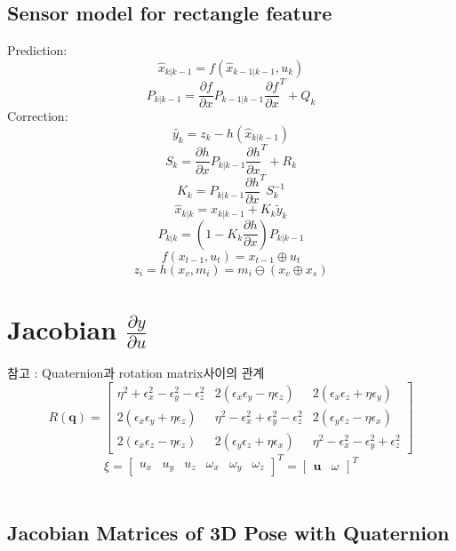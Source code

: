 \documentclass[master,korean,final]{cbnu-ecs}
\begin{document}
\subsection{Sensor model for rectangle feature}
Prediction:
\[
\hat{x}_{k|k-1}=f(\hat{x}_{k-1|k-1}, u_k)
\]
\[
P_{k|k-1}=\frac{\partial{f}}{\partial{x}}P_{k-1|k-1}\frac{\partial{f}}{\partial{x}}^T + Q_k
\]
Correction:
\[
\tilde{y_k}=z_k-h(\hat{x}_{k|k-1})
\]
\[
S_k=\frac{\partial{h}}{\partial{x}}P_{k|k-1}\frac{\partial{h}}{\partial{x}}^T + R_k
\]
\[
K_k=P_{k|k-1}\frac{\partial{h}}{\partial{x}}^T S_k^{-1}
\]
\[
\hat{x}_{k|k}=\hat{x}_{k|k-1}+K_k\tilde{y}_k
\]
\[
P_{k|k}=(1-K_k\frac{\partial{h}}{\partial{x}})P_{k|k-1}
\]
\[
f(x_{t-1}, u_t)= x_{t-1} \oplus u_t
\]
\[
z_i=h(x_v, m_i)=m_i\ominus(x_v\oplus x_s)
\]
\section{Jacobian $\frac{\partial y}{\partial u} $}
참고 : Quaternion과 rotation matrix사이의 관계
\[R(\textbf{q})=
\begin{bmatrix}
\eta^2+\epsilon_x^2-\epsilon_y^2-\epsilon_z^2 & 2(\epsilon_x \epsilon_y - \eta \epsilon_z) & 2(\epsilon_x \epsilon_z + \eta \epsilon_y) \\
2(\epsilon_x \epsilon_y + \eta \epsilon_z) & \eta^2-\epsilon_x^2+\epsilon_y^2-\epsilon_z^2 & 2(\epsilon_y \epsilon_z - \eta \epsilon_x) \\
2(\epsilon_x \epsilon_z - \eta \epsilon_z) & 2(\epsilon_y \epsilon_z + \eta \epsilon_x)  & \eta^2-\epsilon_x^2-\epsilon_y^2+\epsilon_z^2
\end{bmatrix}
\]
\[
\xi = \begin{bmatrix}
u_x & u_y & u_z & \omega_x & \omega_y & \omega_z
\end{bmatrix}^T =
\begin{bmatrix}
\textbf{u} & \omega
\end{bmatrix}^T
\]
\\

\subsection{Jacobian Matrices of 3D Pose with Quaternion}
\end{document}
